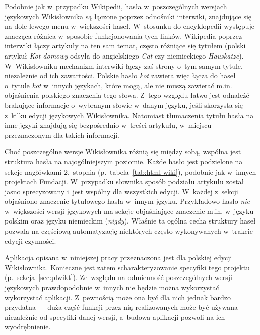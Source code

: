 Podobnie jak w~przypadku Wikipedii, hasła w~poszczególnych wersjach językowych Wikisłownika są łączone poprzez odnośniki interwiki, znajdujące się na dole lewego menu w~większości haseł. W~stosunku do encyklopedii występuje znacząca różnica w~sposobie funkcjonowania tych linków. Wikipedia poprzez interwiki łączy artykuły na ten sam temat, często różniące się tytułem (polski artykuł \emph{Kot domowy} odsyła do angielskiego \emph{Cat} czy niemieckiego \emph{Hauskatze}). W~Wikisłowniku mechanizm interwiki łączy zaś strony o~tym samym tytule, niezależnie od ich zawartości. Polskie hasło \emph{kot} zawiera więc łącza do haseł o~tytule \emph{kot} w~innych językach, które mogą, ale nie muszą zawierać m.in. objaśnienia polskiego znaczenia tego słowa. Z~tego względu łatwo jest odnaleźć brakujące informacje o~wybranym słowie w~danym języku, jeśli skorzysta się z~kilku edycji językowych Wikisłownika. Natomiast tłumaczenia tytułu hasła na inne języki znajdują się bezpośrednio w~treści artykułu, w~miejscu przeznaczonym dla takich informacji.

Choć poszczególne wersje Wikisłownika różnią się między sobą, wspólna jest struktura hasła na najogólniejszym poziomie. Każde hasło jest podzielone na sekcje nagłówkami 2.~stopnia (p.~tabela~\ref{tab:html-wiki}), podobnie jak w~innych projektach Fundacji. W~przypadku słownika sposób podziału artykułu został jasno sprecyzowany i~jest wspólny dla wszystkich edycji. W~każdej z~sekcji objaśniono znaczenie tytułowego hasła w~innym języku. Przykładowo hasło \emph{nie} w~większości wersji językowych ma sekcje objaśniające znaczenie m.in. w~języku polskim oraz języku niemieckim (\emph{nigdy}). Właśnie ta ogólna cecha struktury haseł pozwala na częściową automatyzację niektórych często wykonywanych w~trakcie edycji czynności.

Aplikacja opisana w~niniejszej pracy przeznaczona jest dla polskiej edycji Wikisłownika. Konieczne jest zatem scharakteryzowanie specyfiki tego projektu (p.~sekcja~\ref{sec:plwikt}). Ze~względu na odmienność poszczególnych wersji językowych prawdopodobnie w~innych nie będzie można wykorzystać wykorzystać aplikacji. Z~pewnością może ona być dla nich jednak bardzo przydatna --- duża część funkcji przez nią realizowanych może być używana niezależnie od specyfiki danej wersji, a~budowa aplikacji pozwoli na ich wyodrębnienie.

